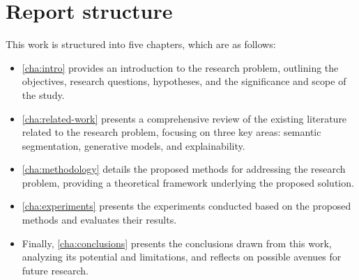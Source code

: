 
\section{Report structure}

This work is structured into five chapters, which are as follows:

\begin{itemize}
\item \autoref{cha:intro} provides an introduction to the research problem, outlining the objectives, research questions, hypotheses, and the significance and scope of the study.
\item \autoref{cha:related-work} presents a comprehensive review of the existing literature related to the research problem, focusing on three key areas: semantic segmentation, generative models, and explainability.
\item \autoref{cha:methodology} details the proposed methods for addressing the research problem, providing a theoretical framework underlying the proposed solution.
\item \autoref{cha:experiments} presents the experiments conducted based on the proposed methods and evaluates their results.
\item Finally, \autoref{cha:conclusions} presents the conclusions drawn from this work, analyzing its potential and limitations, and reflects on possible avenues for future research.%
\end{itemize}






